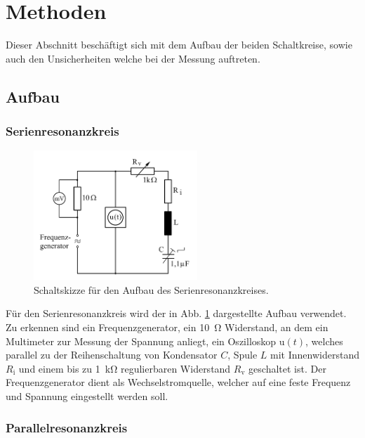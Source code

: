 \section{Methoden}
	
	Dieser Abschnitt beschäftigt sich mit dem Aufbau der beiden Schaltkreise, sowie auch den Unsicherheiten welche bei der Messung auftreten.
	
	\subsection{Aufbau}
			
		\subsubsection{Serienresonanzkreis}
			
			\begin{figure}[ht]
				\centering
				\includegraphics[width=0.55\textwidth]{auswertung/Serienresonanz.PNG}
				\caption{Schaltskizze für den Aufbau des Serienresonanzkreises.}
				\label{fig:SerienResonanzSkizze}	
			\end{figure}
			
			Für den Serienresonanzkreis wird der in Abb. \ref{fig:SerienResonanzSkizze} dargestellte Aufbau verwendet.
			Zu erkennen sind ein Frequenzgenerator, ein \SI{10}{\ohm} Widerstand, an dem ein Multimeter zur Messung der Spannung anliegt, ein Oszilloskop u$(t)$, welches parallel zu der Reihenschaltung von Kondensator $C$, Spule $L$ mit Innenwiderstand $R_\text{i}$ und einem bis zu \SI{1}{\kilo\ohm} regulierbaren Widerstand $R_\text{v}$ geschaltet ist.
			Der Frequenzgenerator dient als Wechselstromquelle, welcher auf eine feste Frequenz und Spannung eingestellt werden soll.
			 
		\subsubsection{Parallelresonanzkreis}
			
